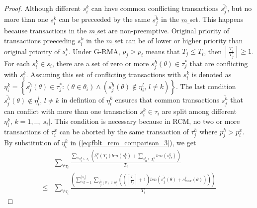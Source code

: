\documentclass[12pt,english]{report}
\newtheorem{proof}{Proof}
\begin{document}
\begin{proof}
Although different $s_{i}^{k}$ can have common conflicting transactions
$\bar{s_{j}^{h}}$, but no more than one $s_{i}^{k}$ can be preceeded
by the same $\bar{s_{j}^{h}}$ in the $m\_$set. This happens because
transactions in the $m\_$set are non-preemptive. Original priority
of transactions preeceding $s_{i}^{k}$ in the $m\_$set can be of
lower or higher priority than original priority of $s_{i}^{k}$. Under
G-RMA, $p_{j}>p_{i}$ means that $T_{j}\le T_{i}$, then $\left\lceil \frac{T_{i}}{T_{j}}\right\rceil \ge1$.
For each $s_{i}^{k}\in s_{i}$, there are a set of zero or more $\bar{s_{j}^{h}}(\theta)\in\tau_{j}^{*}$
that are conflicting with $s_{i}^{k}$. Assuming this set of conflicting
transactions with $s_{i}^{k}$ is denoted as $\eta_{i}^{k}=\left\{ \bar{s_{j}^{h}}(\theta)\in\tau_{j}^{*}:\left(\theta\in\theta_{i}\right)\wedge\left(\bar{s_{j}^{h}}(\theta)\not\in\eta_{i}^{l},\, l\ne k\right)\right\} $.
The last condition $\bar{s_{j}^{h}}(\theta)\not\in\eta_{i}^{l},\, l\ne k$
in defintion of $\eta_{i}^{k}$ ensures that common transactions $\bar{s_{j}^{h}}$
that can conflict with more than one transaction $s_{i}^{k}\in\tau_{i}$
are split among different $\eta_{i}^{k},\, k=1,..,|s_{i}|$. This
condition is necessary because in RCM, no two or more transactions
of $\tau_{i}^{x}$ can be aborted by the same transaction of $\tau_{j}^{h}$
where $p_{j}^{h}>p_{i}^{x}$. By substitution of $\eta_{i}^{k}$ in
(\ref{eq:fblt_rcm_comparison_3}), we get 
\begin{eqnarray}
 & \sum_{\forall\tau_{i}}\frac{\sum_{\forall s_{i}^{k}\in s_{i}}\left(\delta_{i}^{k}(T_{i})len(s_{i}^{k})+\sum_{s_{iz}^k\in \chi_i^k} len(s_{iz}^{k})\right)}{T_{i}}\label{eq:fblt_rcm_comparison_4}\\
\le & \sum_{\forall\tau_{i}}\frac{\left(\sum_{\forall k=1}^{|s_{i}|}\sum_{\bar{s_{j}^{h}}(\theta)\in\eta_{i}^{k}}\left(\left(\left\lceil \frac{T_{i}}{T_{j}}\right\rceil +1\right)len\left(\bar{s_{j}^{h}}(\theta)+s_{max}^{j}(\theta)\right)\right)\right)}{T_{i}}\nonumber 
\end{eqnarray}



\end{proof}
\end{document}
